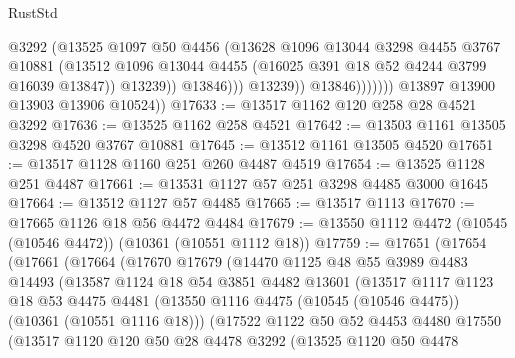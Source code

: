 \begin{lexlean}{RustStd}
\begin{coremodule}
                                @3292
                                (@13525
                                  @1097
                                  @50
                                  @4456
                                  (@13628
                                    @1096
                                    @13044
                                    @3298
                                    @4455
                                    @3767
                                    @10881
                                    (@13512
                                      @1096
                                      @13044
                                      @4455
                                      (@16025 @391 @18 @52 @4244 @3799 @16039 @13847))
                                    @13239))
                                @13846)))
                          @13239))
                      @13846)))))))
        @13897
        @13900
        @13903
        @13906
        @10524))
@17633 := @13517 @1162 @120 @258 @28 @4521 @3292
@17636 := @13525 @1162 @258 @4521
@17642 := @13503 @1161 @13505 @3298 @4520 @3767 @10881
@17645 := @13512 @1161 @13505 @4520
@17651 := @13517 @1128 @1160 @251 @260 @4487 @4519
@17654 := @13525 @1128 @251 @4487
@17661 := @13531 @1127 @57 @251 @3298 @4485 @3000 @1645
@17664 := @13512 @1127 @57 @4485
@17665 := @13517 @1113
@17670 := @17665 @1126 @18 @56 @4472 @4484
@17679 := @13550 @1112 @4472 (@10545 (@10546 @4472)) (@10361 (@10551 @1112 @18))
@17759 := @17651
    (@17654
      (@17661
        (@17664
          (@17670
            @17679
            (@14470
              @1125
              @48
              @55
              @3989
              @4483
              @14493
              (@13587
                @1124
                @18
                @54
                @3851
                @4482
                @13601
                (@13517
                  @1117
                  @1123
                  @18
                  @53
                  @4475
                  @4481
                  (@13550 @1116 @4475 (@10545 (@10546 @4475)) (@10361 (@10551 @1116 @18)))
                  (@17522
                    @1122
                    @50
                    @52
                    @4453
                    @4480
                    @17550
                    (@13517
                      @1120
                      @120
                      @50
                      @28
                      @4478
                      @3292
                      (@13525
                        @1120
                        @50
                        @4478

\end{coremodule}
\end{lexlean}
